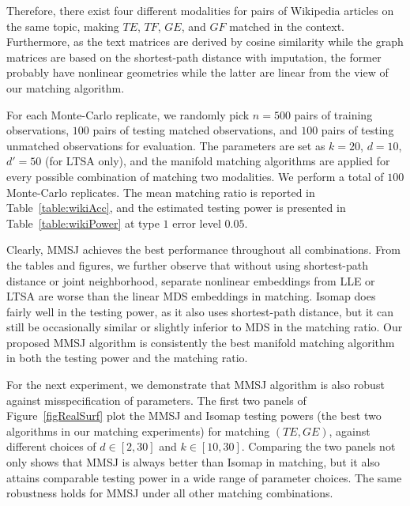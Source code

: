\documentclass[times,twocolumn,final]{elsarticle}
\begin{document}
Therefore, there exist four different modalities for pairs of Wikipedia articles on the same topic, making $TE$, $TF$, $GE$, and $GF$ matched in the context. Furthermore, as the text matrices are derived by cosine similarity while the graph matrices are based on the shortest-path distance with imputation, the former probably have nonlinear geometries while the latter are linear from the view of our matching algorithm.

For each Monte-Carlo replicate, we randomly pick $n=500$ pairs of training observations, $100$ pairs of testing matched observations, and $100$ pairs of testing unmatched observations for evaluation. The parameters are set as $k=20$, $d=10$, $d'=50$ (for LTSA only), and the manifold matching algorithms are applied for every possible combination of matching two modalities. We perform a total of $100$ Monte-Carlo replicates. The mean matching ratio is reported in Table~\ref{table:wikiAcc}, and the estimated testing power is presented in Table~\ref{table:wikiPower} at type $1$ error level $0.05$.

Clearly, MMSJ achieves the best performance throughout all combinations. From the tables and figures, we further observe that without using shortest-path distance or joint neighborhood, separate nonlinear embeddings from LLE or LTSA are worse than the linear MDS embeddings in matching. Isomap does fairly well in the testing power, as it also uses shortest-path distance, but it can still be occasionally similar or slightly inferior to MDS in the matching ratio. Our proposed MMSJ algorithm is consistently the best manifold matching algorithm in both the testing power and the matching ratio.

For the next experiment, we demonstrate that MMSJ algorithm is also robust against misspecification of parameters. The first two panels of Figure~\ref{figRealSurf} plot the MMSJ and Isomap testing powers (the best two algorithms in our matching experiments) for matching $(TE,GE)$, against different choices of $d \in [2,30]$ and $k \in [10,30]$. Comparing the two panels not only shows that MMSJ is always better than Isomap in matching, but it also attains comparable testing power in a wide range of parameter choices.
The same robustness holds for MMSJ under all other matching combinations. 

\end{document}

